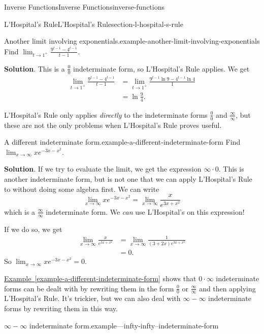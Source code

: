 \documentclass[oneside,10pt,]{book}
\numberwithin{equation}{section}
\begin{document}
\begin{chapterptx}{Inverse Functions}{}{Inverse Functions}{}{}{inverse-functions}
\begin{sectionptx}{L'Hospital's Rule}{}{L'Hospital's Rule}{}{}{section-l-hospital-s-rule}
\begin{example}{Another limit involving exponentials.}{example-another-limit-involving-exponentials}
\hypertarget{p-294}{}%
Find \(\lim_{t\to1^{+}}\frac{9^{t-1} - 4^{t-1}}{t-1}\).%
\par\smallskip%
\noindent\textbf{Solution}.\hypertarget{solution-65}{}\quad%
\hypertarget{p-295}{}%
This is a \(\frac{0}{0}\) indeterminate form, so L'Hospital's Rule applies. We get%
\begin{align*}
\lim_{t\to1^{+}}\frac{9^{t-1} - 4^{t-1}}{t-1} & = \lim_{t\to1^{+}}\frac{9^{t-1}\ln9 - 4^{t-1}\ln4}{1} \\
& = \ln\frac{9}{4}. 
\end{align*}
%
\end{example}
\hypertarget{p-296}{}%
L'Hospital's Rule only applies \emph{directly} to the indeterminate forms \(\frac{0}{0}\) and \(\frac{\infty}{\infty}\), but these are not the only problems when L'Hospital's Rule proves useful.%
\begin{example}{A different indeterminate form.}{example-a-different-indeterminate-form}%
\hypertarget{p-297}{}%
Find \(\lim_{x\to\infty}xe^{-3x - x^{2}}\).%
\par\smallskip%
\noindent\textbf{Solution}.\hypertarget{solution-66}{}\quad%
\hypertarget{p-298}{}%
If we try to evaluate the limit, we get the expression \(\infty\cdot0\). This is another indeterminate form, but is not one that we can apply L'Hospital's Rule to without doing some algebra first. We can write%
\begin{equation*}
\lim_{x\to\infty}xe^{-3x-x^{2}} = \lim_{x\to\infty}\frac{x}{e^{3x+x^{2}}}
\end{equation*}
which is a \(\frac{\infty}{\infty}\) indeterminate form. We \emph{can} use L'Hospital's on this expression!%
\par
\hypertarget{p-299}{}%
If we do so, we get%
\begin{align*}
\lim_{x\to\infty}\frac{x}{e^{3x+x^{2}}} & = \lim_{x\to\infty}\frac{1}{(3+2x)e^{3x+x^{2}}} \\
& = 0. 
\end{align*}
So \(\lim_{x\to\infty}xe^{-3x-x^{2}} = 0\).%
\end{example}
\hypertarget{p-300}{}%
\hyperref[example-a-different-indeterminate-form]{Example~\ref{example-a-different-indeterminate-form}} shows that \(0\cdot\infty\) indeterminate forms can be dealt with by rewriting them in the form \(\frac{0}{0}\) or \(\frac{\infty}{\infty}\) and then applying L'Hospital's Rule. It's trickier, but we can also deal with \(\infty-\infty\) indeterminate forms by rewriting them in this way.%
\begin{example}{\(\infty-\infty\) indeterminate form.}{example---infty-infty--indeterminate-form}%

\end{example}
\end{sectionptx}
\end{chapterptx}
\end{document}
